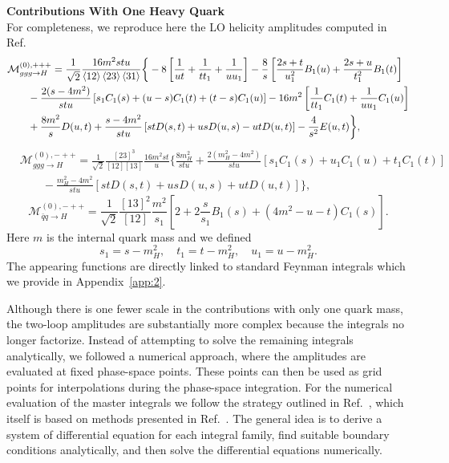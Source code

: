 \textbf{Contributions With One Heavy Quark} \\
For completeness, we reproduce here the \acs{LO} helicity amplitudes computed in Ref.~\cite{Baur:1989cm}
\begin{equation}
\begin{split}
& \mathcal{M}_{ggg \rightarrow H}^{(0), +++} = \frac{1}{\sqrt{2}} \frac{16 m^2 stu}{\braket{12}\braket{23}\braket{31}} \bigg \lbrace - 8 \left[ \frac{1}{u t} + \frac{1}{t t_1} + \frac{1}{u u_1} \right] - \frac{8}{s} \left[ \frac{2 s + t}{u_1^2} B_1(u) + \frac{2 s + u}{t_1^2} B_1(t) \right] \\
& \qquad - \frac{2 (s - 4 m^2)}{stu} \left[ s_1 C_1(s) + (u - s) C_1(t) + (t - s) C_1(u) \right] - 16 m^2 \left[ \frac{1}{t t_1} C_1(t) + \frac{1}{u u_1} C_1(u) \right] \\
& \qquad + \frac{8 m^2}{s} D(u, t) + \frac{s - 4 m^2}{s t u} \left[ s t D(s, t) + u s D(u, s) - u t D(u, t) \right] - \frac{4}{s^2} E(u, t) \bigg \rbrace,
\end{split}
\end{equation}
%
%
\begin{equation}
\begin{split}
& \mathcal{M}_{ggg \rightarrow H}^{(0), -++} = \frac{1}{\sqrt{2}} \frac{[23]^3}{[12][13]} \frac{16 m^2 s t}{u} \bigg \lbrace \frac{8 m_H^2}{s t u} + \frac{2 (m_H^2 - 4 m^2)}{stu} \left[ s_1 C_1(s) + u_1 C_1(u) + t_1 C_1(t) \right] \\
&\qquad - \frac{m_H^2 - 4 m^2}{stu} \left[ s t D(s, t) + u s D(u, s) + u t D(u, t) \right] \bigg \rbrace,
\end{split}
\end{equation}
%
%
\begin{equation}
\mathcal{M}_{\bar{q} q \rightarrow H}^{(0), -++} = \frac{1}{\sqrt{2}} \frac{[13]^2}{[12]} \frac{m^2}{s_1} \left[ 2 + 2 \frac{s}{s_1} B_1(s) + \left(4 m^2 - u - t \right) C_1(s) \right].
\end{equation}
Here $m$ is the internal quark mass and we defined
\begin{equation}
s_1 = s - m_H^2, \quad t_1 = t - m_H^2, \quad u_1 = u - m_H^2.
\end{equation}
The appearing functions are directly linked to standard Feynman integrals which we provide in Appendix~\ref{app:2}.

Although there is one fewer scale in the contributions with only one quark mass, the two-loop amplitudes are substantially more complex because the integrals no longer factorize. Instead of attempting to solve the remaining integrals analytically, we followed a numerical approach, where the amplitudes are evaluated at fixed phase-space points. These points can then be used as grid points for interpolations during the phase-space integration. For the numerical evaluation of the master integrals we follow the strategy outlined in Ref.~\cite{Czakon:2021yub}, which itself is based on methods presented in Ref.~\cite{Czakon:2015exa}. The general idea is to derive a system of differential equation for each integral family, find suitable boundary conditions analytically, and then solve the differential equations numerically.

